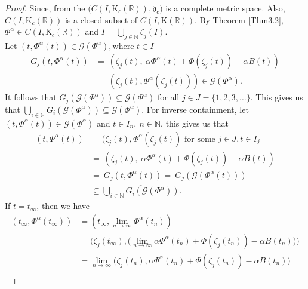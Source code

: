 \documentclass[12pt,oneside,reqno]{amsart}
\theoremstyle{definition}
\theoremstyle{remark}
\begin{document}
 \begin{proof}
     Since, from the \cite[Lemma $6$]{Ver21} $\big(C(I,\mathrm{K}_c(\mathbb{R})), \mathfrak{d}_c\big)$ is a complete metric space. Also, $C(I,\mathrm{K}_c(\mathbb{R}))$ is a closed subset of $C(I,\mathrm{K}(\mathbb{R}))$. By Theorem \ref{Thm3.2}, $\Phi^\alpha \in C(I,\mathrm{K}_c(\mathbb{R}))$ and $I=\underset{j\in \mathbb{N}}{\bigcup}\zeta_j(I).$\\
     Let $(t,\Phi^\alpha(t)) \in \mathcal{G}(\Phi^\alpha), \text{where }  t \in I$
     \begin{equation*}
          \begin{aligned}
         G_j(t,\Phi^\alpha (t)) &=~(\zeta_j(t), ~\alpha \Phi^\alpha (t)+\Phi(\zeta_j(t))-\alpha B(t))\\
         &=~(\zeta_j(t),\Phi^\alpha (\zeta_j(t))) \in \mathcal{G}(\Phi^\alpha ).
             \end{aligned}
          \end{equation*}
It follows that $G_j(\mathcal{G}(\Phi^\alpha)) \subseteq \mathcal{G}(\Phi^\alpha)$ for all $j\in J=\{1,2,3,\ldots\}$. This gives us that $\overline{\underset{i\in \mathbb{N}}{\bigcup}G_i(\mathcal{G}(\Phi^\alpha))} \subseteq \mathcal{G}(\Phi^\alpha)$. For inverse containment, let $(t,\Phi^\alpha(t)) \in \mathcal{G}(\Phi^\alpha ) $ and $t \in I_n,~n\in \mathbb{N}$, this gives us that 
          \begin{equation*}
              \begin{aligned}
                  (t,\Phi^\alpha (t))&=(\zeta_j(t), \Phi^\alpha (\zeta_j(t)) \text{ for some }j \in J, t\in I_j \\
                  &=~(\zeta_j(t),~\alpha \Phi^\alpha (t)+\Phi(\zeta_j(t))-\alpha B(t))\\ &=~G_j(t,\Phi^\alpha(t))=~G_j(\mathcal{G}(\Phi^\alpha(t) ))\\
                  &\subseteq \overline{ \underset{i\in \mathbb{N}}{\bigcup}G_i(\mathcal{G}(\Phi^\alpha))} .
            \end{aligned}
          \end{equation*}
          If $t=t_\infty$, then we have
          \begin{equation*}
              \begin{aligned}
                  (t_\infty,\Phi^\alpha(t_\infty))&=(t_\infty,\underset{n\rightarrow \infty}{\lim}\Phi^\alpha (t_n)) \\&=\Big(\zeta_j(t_\infty),\big(\underset{n\rightarrow \infty}{\lim}\alpha \Phi^\alpha (t_n)+\Phi(\zeta_j(t_n))-\alpha B(t_n)\big)\Big)\\&= \underset{n\rightarrow \infty}{\lim}\big(\zeta_j(t_n),\alpha \Phi^\alpha (t_n)+\Phi(\zeta_j(t_n))-\alpha B(t_n)\big)\\

\end{aligned}
\end{equation*}
\end{proof}
\end{document}
